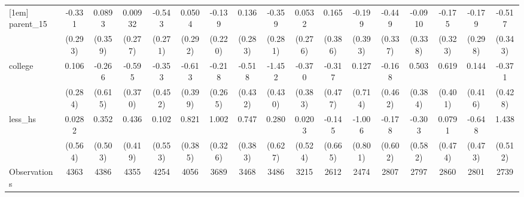 {\begin{tabular}{l*{16}{c}}
[1em]
parent\_15           &      -0.331         &      0.0893         &     0.00932         &      -0.543\sym{*}  &      0.0504         &      -0.139         &       0.136         &      -0.359         &      0.0532         &       0.165         &      -0.199         &      -0.449         &     -0.0910         &      -0.175         &      -0.179         &      -0.517         \\
                    &     (0.293)         &     (0.359)         &     (0.277)         &     (0.271)         &     (0.292)         &     (0.220)         &     (0.283)         &     (0.281)         &     (0.276)         &     (0.386)         &     (0.393)         &     (0.337)         &     (0.338)         &     (0.323)         &     (0.298)         &     (0.343)         \\
[1em]
college             &       0.106         &      -0.266         &      -0.595         &      -0.353         &      -0.613         &      -0.218         &      -0.518         &      -1.452\sym{***}&      -0.370         &      -0.317         &       0.127         &      -0.168         &       0.503         &       0.619         &       0.144         &      -0.371         \\
                    &     (0.284)         &     (0.615)         &     (0.370)         &     (0.452)         &     (0.399)         &     (0.265)         &     (0.432)         &     (0.430)         &     (0.383)         &     (0.477)         &     (0.714)         &     (0.462)         &     (0.384)         &     (0.401)         &     (0.416)         &     (0.428)         \\
[1em]
less\_hs             &      0.0282         &       0.352         &       0.436         &       0.102         &       0.821\sym{*}  &       1.002\sym{**} &       0.747         &       0.280         &      0.0203         &      -0.145         &      -1.006         &      -0.178         &      -0.303         &      0.0791         &      -0.648         &       1.438\sym{**} \\
                    &     (0.564)         &     (0.503)         &     (0.419)         &     (0.553)         &     (0.385)         &     (0.326)         &     (0.383)         &     (0.627)         &     (0.524)         &     (0.665)         &     (0.801)         &     (0.602)         &     (0.582)         &     (0.474)         &     (0.473)         &     (0.512)         \\
\hline
Observations        &        4363         &        4386         &        4355         &        4254         &        4056         &        3689         &        3468         &        3486         &        3215         &        2612         &        2474         &        2807         &        2797         &        2860         &        2801         &        2739         \\

\end{tabular}}
